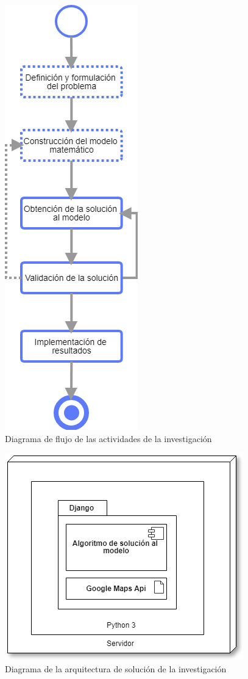 \begin{figure}[!ht]
    \centering
    \includegraphics[scale=.5]{Capitulo4/Figs/fases_investigacion.png}
    \caption{Diagrama de flujo de las actividades de la investigación}
    \label{fig:fases_investigacion}
\end{figure}
\begin{figure}[!ht]
    \centering
    \includegraphics[scale=.5]{Capitulo4/Figs/aquitectura_solucion.png}
    \caption{Diagrama de la arquitectura de solución de la investigación}
    \label{fig:aquitectura_solucion}
\end{figure}

